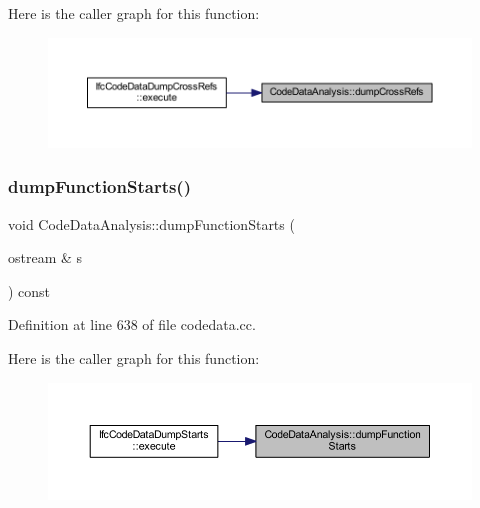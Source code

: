 Here is the caller graph for this function\+:
\nopagebreak
\begin{figure}[H]
\begin{center}
\leavevmode
\includegraphics[width=350pt]{class_code_data_analysis_a0bc5f3f9fe210f9602025884b41a39aa_icgraph}
\end{center}
\end{figure}
\mbox{\label{class_code_data_analysis_a4929ff0dbefe9f019e29f675d2a8d16e}} 
\subsubsection{\texorpdfstring{dumpFunctionStarts()}{dumpFunctionStarts()}}
{\footnotesize\ttfamily void Code\+Data\+Analysis\+::dump\+Function\+Starts (\begin{DoxyParamCaption}\item[{ostream \&}]{s }\end{DoxyParamCaption}) const}



Definition at line 638 of file codedata.\+cc.

Here is the caller graph for this function\+:
\nopagebreak
\begin{figure}[H]
\begin{center}
\leavevmode
\includegraphics[width=350pt]{class_code_data_analysis_a4929ff0dbefe9f019e29f675d2a8d16e_icgraph}
\end{center}
\end{figure}
\mbox{\label{class_code_data_analysis_a6bbc01214c5235583b79a2e9f014bfbf}} 
